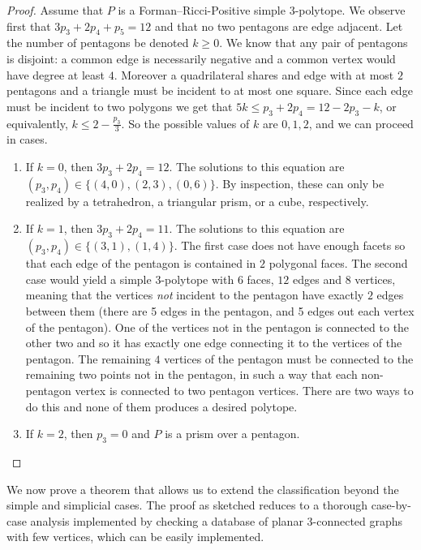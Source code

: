 \documentclass[11pt,a4paper]{amsart}
\begin{document}
\begin{proof}
    Assume that $P$ is a Forman--Ricci-Positive simple $3$-polytope. We observe first that $3p_3+2p_4+p_5=12$ and that no two pentagons are edge adjacent. Let the number of pentagons be denoted $k\geq 0$. We know that any pair of pentagons is disjoint: a common edge is necessarily negative and a common vertex would have degree at least $4$. Moreover a quadrilateral shares and edge with at most $2$ pentagons and a triangle must be incident to at most one square. Since each edge must be incident to two polygons we get that $5k \le p_3 + 2p_4= 12-2p_3-k$, or equivalently, $k\le 2 - \frac{p_3}3$. So the possible values of $k$ are $0,1,2$, and we can proceed in cases.
    
    \begin{enumerate}[label=\emph{(\roman*)}]

        \item If $k=0$, then $3p_3+2p_4= 12$. The solutions to this equation are $(p_3,p_4) \in \{(4,0), (2,3), (0,6)\}$. By inspection, these can only be realized by a tetrahedron, a triangular prism, or a cube, respectively. 
    
        \item If $k=1$, then $3p_3+2p_4= 11$. The solutions to this equation are $(p_3,p_4) \in \{(3,1), (1,4)\}$. The first case does not have enough facets so that each edge of the pentagon is contained in $2$ polygonal faces. The second case would yield a simple $3$-polytope with $6$ faces, $12$ edges and $8$ vertices, meaning that the vertices \emph{not} incident to the pentagon have exactly $2$ edges between them (there are 5 edges in the pentagon, and 5 edges out each vertex of the pentagon). One of the vertices not in the pentagon is connected to the other two and so it has exactly one edge connecting it to the vertices of the pentagon. The remaining $4$ vertices of the pentagon must be connected to the remaining two points not in the pentagon, in such a way that each non-pentagon vertex is connected to two pentagon vertices. There are two ways to do this and none of them produces a desired polytope.

        \item If $k=2$, then $p_3=0$ and $P$ is a prism over a pentagon.
    \end{enumerate} 

\end{proof}

We now prove a theorem that allows us to extend the classification beyond the simple and simplicial cases. The proof as sketched reduces to a thorough case-by-case analysis implemented by checking a database of planar $3$-connected graphs with few vertices, which can be easily implemented. 
\end{document}
